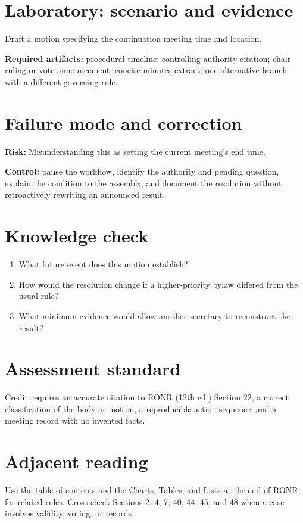\documentclass[11pt]{article}
\begin{document}
\section{Laboratory: scenario and evidence}
Draft a motion specifying the continuation meeting time and location.

\textbf{Required artifacts:} procedural timeline; controlling authority citation; chair ruling or vote announcement; concise minutes extract; one alternative branch with a different governing rule.

\section{Failure mode and correction}
\textbf{Risk:} Misunderstanding this as setting the current meeting’s end time.

\textbf{Control:} pause the workflow, identify the authority and pending question, explain the condition to the assembly, and document the resolution without retroactively rewriting an announced result.

\section{Knowledge check}
\begin{enumerate}[leftmargin=*,itemsep=4pt]
\item What future event does this motion establish?
\item How would the resolution change if a higher-priority bylaw differed from the usual rule?
\item What minimum evidence would allow another secretary to reconstruct the result?
\end{enumerate}

\section{Assessment standard}
Credit requires an accurate citation to RONR (12th ed.) Section 22, a correct classification of the body or motion, a reproducible action sequence, and a meeting record with no invented facts.

\section{Adjacent reading}
Use the table of contents and the Charts, Tables, and Lists at the end of RONR for related rules. Cross-check Sections 2, 4, 7, 40, 44, 45, and 48 when a case involves validity, voting, or records.
\end{document}
